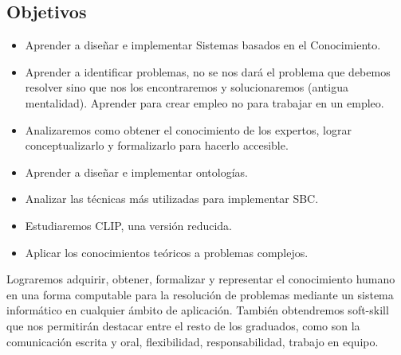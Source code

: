 \documentclass[12pt, twoside, openright]{report} %
\begin{document}
\subsection{Objetivos}
\begin{itemize}
  \item Aprender a diseñar e implementar Sistemas basados en el Conocimiento.
  \item Aprender a identificar problemas, no se nos dará el problema que debemos resolver sino que nos los encontraremos y solucionaremos (antigua mentalidad). Aprender para crear empleo no para trabajar en un empleo.
  \item Analizaremos como obtener el conocimiento de los expertos, lograr conceptualizarlo y formalizarlo para hacerlo accesible.
  \item Aprender a diseñar e implementar ontologías.
  \item Analizar las técnicas más utilizadas para implementar SBC.
  \item Estudiaremos CLIP, una versión reducida.
  \item Aplicar los conocimientos teóricos a problemas complejos.
\end{itemize}
Lograremos adquirir, obtener, formalizar y representar el conocimiento humano en una forma computable para la resolución de problemas mediante un sistema informático en cualquier ámbito de aplicación.
También obtendremos soft-skill que nos permitirán destacar entre el resto de los graduados, como son la comunicación escrita y oral, flexibilidad, responsabilidad, trabajo en equipo.

\pagebreak
\end{document}
